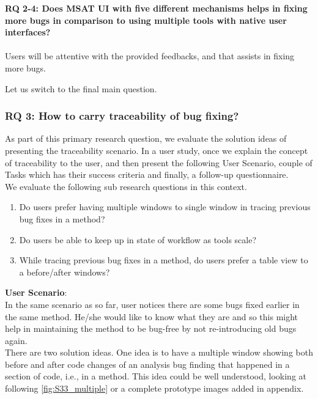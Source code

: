 \begin{myboxi}{{\textbf{RQ 2-4: Does MSAT UI with five different mechanisms helps in fixing more bugs in comparison to using multiple tools with native user interfaces?}}}
	\\ \\ Users will be attentive with the provided feedbacks, and that assists in fixing more bugs. 
\end{myboxi}
\hfill \break

Let us switch to the final main question. \\

\subsubsection{RQ 3: How to carry traceability of bug fixing?}

As part of this primary research question, we evaluate the solution ideas of presenting the traceability scenario. In a user study, once we explain the concept of traceability to the user, and then present the following User Scenario, couple of Tasks which has their success criteria and finally, a follow-up questionnaire. \\

We evaluate the following sub research questions in this context. \\

\begin{enumerate}
\item Do users prefer having multiple windows to single window in tracing previous bug fixes in a method?
\item Do users be able to keep up in state of workflow as tools scale?
\item While tracing previous bug fixes in a method, do users prefer a table view to a before/after windows?
\end{enumerate}


\textbf{User Scenario}: \\

In the same scenario as so far, user notices there are some bugs fixed earlier in the same method. He/she would like to know what they are and so this might help in maintaining the method to be bug-free by not re-introducing old bugs again. \\

There are two solution ideas. One idea is to have a multiple window showing both before and after code changes of an analysis bug finding that happened in a section of code, i.e., in a method. This idea could be well understood, looking at following \autoref{fig:S33_multiple} or a complete prototype images added in appendix. \\


